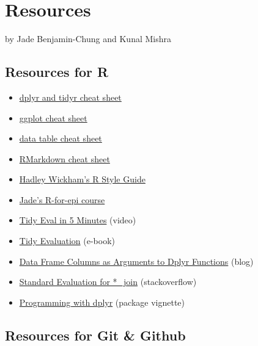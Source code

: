 \documentclass[
]{book}
\providecommand{\tightlist}{%
  \setlength{\itemsep}{0pt}\setlength{\parskip}{0pt}}
\begin{document}
\chapter{Resources}\label{resources}

by Jade Benjamin-Chung and Kunal Mishra

\section{Resources for R}\label{resources-for-r}

\begin{itemize}
\tightlist
\item
  \href{https://www.rstudio.com/wp-content/uploads/2015/02/data-wrangling-cheatsheet.pdf}{dplyr and tidyr cheat sheet}
\item
  \href{https://www.rstudio.com/wp-content/uploads/2015/03/ggplot2-cheatsheet.pdf}{ggplot cheat sheet}
\item
  \href{https://s3.amazonaws.com/assets.datacamp.com/blog_assets/datatable_Cheat_Sheet_R.pdf}{data table cheat sheet}
\item
  \href{https://www.rstudio.com/wp-content/uploads/2015/02/rmarkdown-cheatsheet.pdf}{RMarkdown cheat sheet}
\item
  \href{http://adv-r.had.co.nz/Style.html}{Hadley Wickham's R Style Guide}
\item
  \href{https://ucb-epi-r.github.io}{Jade's R-for-epi course}
\item
  \href{https://www.youtube.com/watch?v=nERXS3ssntw}{Tidy Eval in 5 Minutes} (video)
\item
  \href{https://tidyeval.tidyverse.org/index.html}{Tidy Evaluation} (e-book)
\item
  \href{https://www.brodrigues.co/blog/2016-07-18-data-frame-columns-as-arguments-to-dplyr-functions/}{Data Frame Columns as Arguments to Dplyr Functions} (blog)
\item
  \href{https://stackoverflow.com/questions/28125816/r-standard-evaluation-for-join-dplyr}{Standard Evaluation for *\_join} (stackoverflow)
\item
  \href{https://dplyr.tidyverse.org/articles/programming.html}{Programming with dplyr} (package vignette)
\end{itemize}

\section{Resources for Git \& Github}\label{resources-for-git-github}
\end{document}
